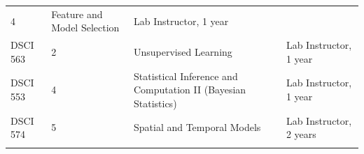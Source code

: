 \documentclass[]{article}
\begin{document}
\begin{longtable}[]{@{}llll@{}}
\begin{minipage}[t]{0.29\columnwidth}
4\strut
\end{minipage} & \begin{minipage}[t]{0.13\columnwidth}\raggedright
Feature and Model Selection\strut
\end{minipage} & \begin{minipage}[t]{0.25\columnwidth}\raggedright
Lab Instructor, 1 year\strut
\end{minipage}\tabularnewline
\begin{minipage}[t]{0.21\columnwidth}\raggedright
DSCI 563\strut
\end{minipage} & \begin{minipage}[t]{0.29\columnwidth}\raggedright
2\strut
\end{minipage} & \begin{minipage}[t]{0.13\columnwidth}\raggedright
Unsupervised Learning\strut
\end{minipage} & \begin{minipage}[t]{0.25\columnwidth}\raggedright
Lab Instructor, 1 year\strut
\end{minipage}\tabularnewline
\begin{minipage}[t]{0.21\columnwidth}\raggedright
DSCI 553\strut
\end{minipage} & \begin{minipage}[t]{0.29\columnwidth}\raggedright
4\strut
\end{minipage} & \begin{minipage}[t]{0.13\columnwidth}\raggedright
Statistical Inference and Computation II (Bayesian Statistics)\strut
\end{minipage} & \begin{minipage}[t]{0.25\columnwidth}\raggedright
Lab Instructor, 1 year\strut
\end{minipage}\tabularnewline
\begin{minipage}[t]{0.21\columnwidth}\raggedright
DSCI 574\strut
\end{minipage} & \begin{minipage}[t]{0.29\columnwidth}\raggedright
5\strut
\end{minipage} & \begin{minipage}[t]{0.13\columnwidth}\raggedright
Spatial and Temporal Models\strut
\end{minipage} & \begin{minipage}[t]{0.25\columnwidth}\raggedright
Lab Instructor, 2 years\strut
\end{minipage}\tabularnewline
\begin{minipage}[t]{0.21\columnwidth}\raggedright

\end{minipage}
\end{longtable}
\end{document}
